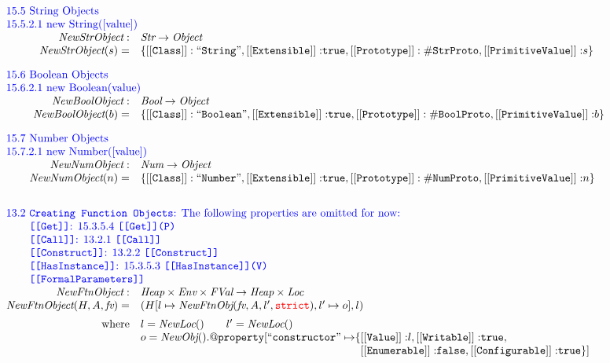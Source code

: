 \[\begin{array}{rl}
\multicolumn{2}{l}{\mbox{\inblue 15.5 String Objects}}\\
\multicolumn{2}{l}{\mbox{\inblue 15.5.2.1 new String([value])}}\\
\hf{NewStrObject} : & \Str \rightarrow \Obj\\
\hf{NewStrObject}(s)=&
 {\tt \{[[Class]]: ``String"}, {\tt [[Extensible]]:} \true,%
{\tt [[Prototype]]: \#StrProto},
{\tt [[PrimitiveValue]]:} s\} \\[1em]

\multicolumn{2}{l}{\mbox{\inblue 15.6 Boolean Objects}}\\
\multicolumn{2}{l}{\mbox{\inblue 15.6.2.1 new Boolean(value)}}\\
\hf{NewBoolObject} : & \Bool \rightarrow \Obj\\
\hf{NewBoolObject}(b)=&
 {\tt \{[[Class]]: ``Boolean"}, {\tt [[Extensible]]:} \true,
{\tt [[Prototype]]: \#BoolProto},
{\tt [[PrimitiveValue]]:} b\} \\[1em]%

\multicolumn{2}{l}{\mbox{\inblue 15.7 Number Objects}}\\
\multicolumn{2}{l}{\mbox{\inblue 15.7.2.1 new Number([value])}}\\
\hf{NewNumObject}: & \Num \rightarrow \Obj\\
\hf{NewNumObject}(n)=&
 {\tt \{[[Class]]: ``Number"}, {\tt [[Extensible]]:} \true,
{\tt [[Prototype]]: \#NumProto},
{\tt [[PrimitiveValue]]:} n\}%
\\[2em]


\multicolumn{2}{l}{\mbox{\inblue 13.2 {\tt Creating Function Objects}: The following properties are omitted for now:}}\\
\multicolumn{2}{l}{\mbox{\inblue \phantom{13.2} {\tt [[Get]]}: 15.3.5.4 {\tt [[Get]](P)}}}\\
\multicolumn{2}{l}{\mbox{\inblue \phantom{13.2} {\tt [[Call]]}: 13.2.1 {\tt [[Call]]}}}\\
\multicolumn{2}{l}{\mbox{\inblue \phantom{13.2} {\tt [[Construct]]}: 13.2.2 {\tt [[Construct]]}}}\\
\multicolumn{2}{l}{\mbox{\inblue \phantom{13.2} {\tt [[HasInstance]]}: 15.3.5.3 {\tt [[HasInstance]](V)}}}\\
\multicolumn{2}{l}{\mbox{\inblue \phantom{13.2} {\tt [[FormalParameters]]}}}\\

\hf{NewFtnObject}: & \Heap \times \Env \times \FVal \rightarrow \Heap \times \Loc\\
\hf{NewFtnObject}(H,A,\emph{fv})=&
(H[l\mapsto\hf{NewFtnObj}(\emph{fv},A,l',\strict), l'\mapsto o], l)
\\[.5em]
\mbox{where} &
l = \hf{NewLoc}()
\rulesep
l' = \hf{NewLoc}()
\\
&
o = \hf{NewObj}().{\tt @property}[{\tt``constructor"\mapsto}\{{\tt [[Value]]:}l,%
 {\tt [[Writable]]:} \true,\\
&\phantom{o = \hf{NewObj}().{\tt @property}[{\tt``constructor"\mapsto}\{}%
 {\tt [[Enumerable]]:} \false,
 {\tt [[Configurable]]:} \true\}]


\end{array}\]
